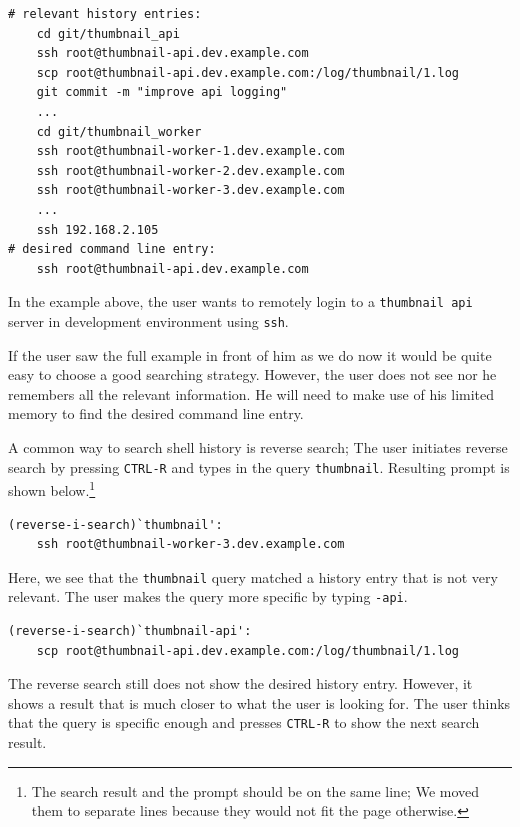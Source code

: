 
\begin{verbatim}
# relevant history entries:
    cd git/thumbnail_api
    ssh root@thumbnail-api.dev.example.com
    scp root@thumbnail-api.dev.example.com:/log/thumbnail/1.log
    git commit -m "improve api logging"
    ...
    cd git/thumbnail_worker
    ssh root@thumbnail-worker-1.dev.example.com
    ssh root@thumbnail-worker-2.dev.example.com
    ssh root@thumbnail-worker-3.dev.example.com
    ...
    ssh 192.168.2.105
# desired command line entry:
    ssh root@thumbnail-api.dev.example.com
\end{verbatim}

In the example above, the user wants to remotely login to a \verb|thumbnail api| server in development environment using \verb|ssh|. 

If the user saw the full example in front of him as we do now it would be quite easy to choose a good searching strategy. However, the user does not see nor he remembers all the relevant information. He will need to make use of his limited memory to find the desired command line entry. 

A common way to search shell history is reverse search; The user initiates reverse search by pressing \verb|CTRL-R| and types in the query \verb|thumbnail|. Resulting prompt is shown below.\footnote{The search result and the prompt should be on the same line; We moved them to separate lines because they would not fit the page otherwise.}

\begin{verbatim}
(reverse-i-search)`thumbnail': 
    ssh root@thumbnail-worker-3.dev.example.com
\end{verbatim}

Here, we see that the \verb|thumbnail| query matched a history entry that is not very relevant. The user makes the query more specific by typing \verb|-api|.

\begin{verbatim}
(reverse-i-search)`thumbnail-api': 
    scp root@thumbnail-api.dev.example.com:/log/thumbnail/1.log
\end{verbatim}

The reverse search still does not show the desired history entry. However,  it shows a result that is much closer to what the user is looking for. The user thinks that the query is specific enough and presses \verb|CTRL-R| to show the next search result.


